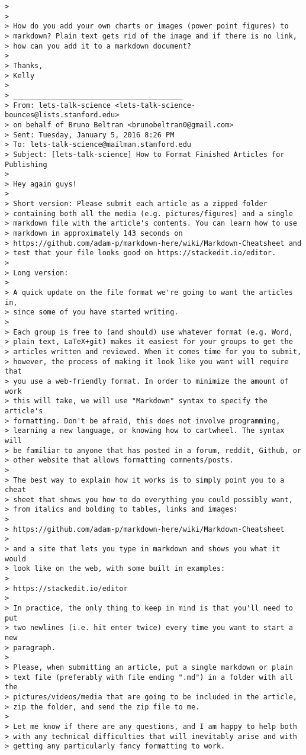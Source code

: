 \documentclass[paper=a4, fontsize=11pt]{scrartcl}
\numberwithin{equation}{section}        %
\numberwithin{figure}{section}            %
\numberwithin{table}{section}                %
\begin{document}
\begin{verbatim}
>
>
> How do you add your own charts or images (power point figures) to
> markdown? Plain text gets rid of the image and if there is no link,
> how can you add it to a markdown document?
>
> Thanks,
> Kelly
>
> ________________________________________
> From: lets-talk-science <lets-talk-science-bounces@lists.stanford.edu>
> on behalf of Bruno Beltran <brunobeltran0@gmail.com>
> Sent: Tuesday, January 5, 2016 8:26 PM
> To: lets-talk-science@mailman.stanford.edu
> Subject: [lets-talk-science] How to Format Finished Articles for Publishing
>
> Hey again guys!
>
> Short version: Please submit each article as a zipped folder
> containing both all the media (e.g. pictures/figures) and a single
> markdown file with the article's contents. You can learn how to use
> markdown in approximately 143 seconds on
> https://github.com/adam-p/markdown-here/wiki/Markdown-Cheatsheet and
> test that your file looks good on https://stackedit.io/editor.
>
> Long version:
>
> A quick update on the file format we're going to want the articles in,
> since some of you have started writing.
>
> Each group is free to (and should) use whatever format (e.g. Word,
> plain text, LaTeX+git) makes it easiest for your groups to get the
> articles written and reviewed. When it comes time for you to submit,
> however, the process of making it look like you want will require that
> you use a web-friendly format. In order to minimize the amount of work
> this will take, we will use "Markdown" syntax to specify the article's
> formatting. Don't be afraid, this does not involve programming,
> learning a new language, or knowing how to cartwheel. The syntax will
> be familiar to anyone that has posted in a forum, reddit, Github, or
> other website that allows formatting comments/posts.
>
> The best way to explain how it works is to simply point you to a cheat
> sheet that shows you how to do everything you could possibly want,
> from italics and bolding to tables, links and images:
>
> https://github.com/adam-p/markdown-here/wiki/Markdown-Cheatsheet
>
> and a site that lets you type in markdown and shows you what it would
> look like on the web, with some built in examples:
>
> https://stackedit.io/editor
>
> In practice, the only thing to keep in mind is that you'll need to put
> two newlines (i.e. hit enter twice) every time you want to start a new
> paragraph.
>
> Please, when submitting an article, put a single markdown or plain
> text file (preferably with file ending ".md") in a folder with all the
> pictures/videos/media that are going to be included in the article,
> zip the folder, and send the zip file to me.
>
> Let me know if there are any questions, and I am happy to help both
> with any technical difficulties that will inevitably arise and with
> getting any particularly fancy formatting to work.
\end{verbatim}
\end{document}
